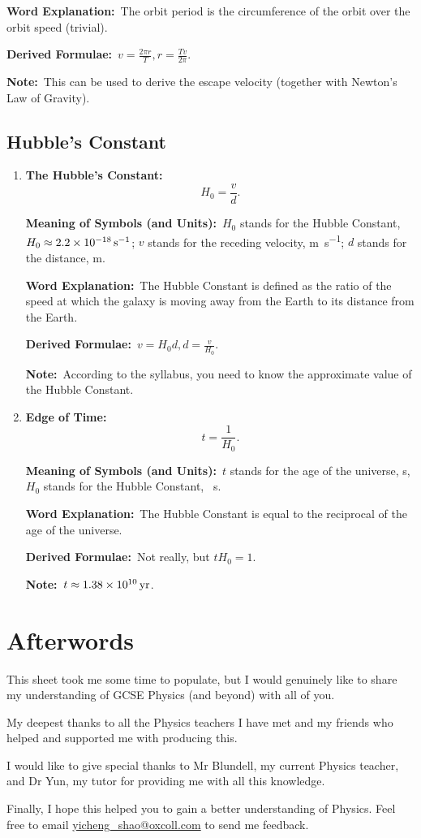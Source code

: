 \documentclass[8pt]{article}
\newcommand{\MeanSymb}{\textbf{Meaning of Symbols (and Units):}\ }
\newcommand{\WordExpl}{\textbf{Word Explanation:}\ }
\newcommand{\DeriForm}{\textbf{Derived Formulae:}\ }
\newcommand{\Note}{\textbf{Note:}\ }
\begin{document}
            \WordExpl The orbit period is the circumference of the orbit over the orbit speed (trivial).

            \DeriForm \(v = \frac{2\pi r}{T}, r = \frac{Tv}{2\pi}\).

            \Note This can be used to derive the escape velocity (together with Newton's Law of Gravity).

        \subsection{Hubble's Constant}
            \begin{enumerate}
                \item \textbf{The Hubble's Constant:}
                \[
                    H_0 = \frac{v}{d}.
                \]

                \MeanSymb \(H_0\) stands for the Hubble Constant, \(H_0 \approx \qty{2.2 e -18}{\per \second}\); \(v\) stands for the receding velocity, \unit{\metre\per\second}; \(d\) stands for the distance, \unit{\metre}.

                \WordExpl The Hubble Constant is defined as the ratio of the speed at which the galaxy is moving away from the Earth to its distance from the Earth.

                \DeriForm \(v = H_0 d, d = \frac{v}{H_0}\).

                \Note According to the syllabus, you need to know the approximate value of the Hubble Constant.

                \item \textbf{Edge of Time:}
                \[
                    t = \frac{1}{H_0}.
                \]

                \MeanSymb \(t\) stands for the age of the universe, \unit{\second}, \(H_0\) stands for the Hubble Constant, \unit{\per\second}.

                \WordExpl The Hubble Constant is equal to the reciprocal of the age of the universe.

                \DeriForm Not really, but \(t H_0 = 1\).

                \Note \(t \approx \qty{1.38 e 10}{\mathrm{yr}}\).
            \end{enumerate}

    \section*{Afterwords}
        This sheet took me some time to populate, but I would genuinely like to share my understanding of GCSE Physics (and beyond) with all of you.
        
        My deepest thanks to all the Physics teachers I have met and my friends who helped and supported me with producing this.
        
        I would like to give special thanks to Mr Blundell, my current Physics teacher, and Dr Yun, my tutor for providing me with all this knowledge.

        Finally, I hope this helped you to gain a better understanding of Physics. Feel free to email \href{yicheng\_shao@oxcoll.com}{yicheng\_shao@oxcoll.com} to send me feedback.
\end{document}

